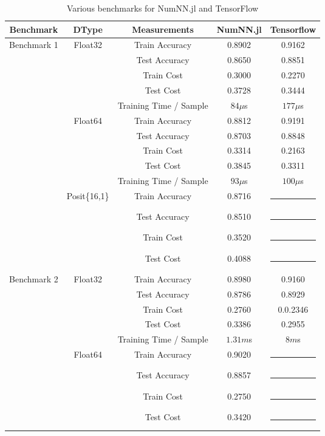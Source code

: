 \begin{table}[!ht]
	\centering
	\renewcommand{\arraystretch}{1.1}
	\caption{Various benchmarks for NumNN.jl and TensorFlow}\label{tab:bench}
	\begin{tabular}{|c | c | c || c | c |}
		\hline
		Benchmark & DType & Measurements & NumNN.jl & Tensorflow\\\hline\hline
		\multirow{14}{*}{Benchmark 1} & \multirow{5}{*}{Float32} & Train Accuracy & 0.8902 & 0.9162\\
		& & Test Accuracy & 0.8650 & 0.8851\\
		& & Train Cost & 0.3000 & 0.2270\\
		& & Test Cost & 0.3728 & 0.3444\\
		& & Training Time / Sample & $84\mu$s  & $177\mu$s\\\cline{2-5}
		& \multirow{5}{*}{Float64} & Train Accuracy & 0.8812 & 0.9191 \\
		& & Test Accuracy & 0.8703 & 0.8848 \\
		& & Train Cost & 0.3314 & 0.2163 \\
		& & Test Cost & 0.3845 & 0.3311 \\
		& & Training Time / Sample & $93\mu$s & $100\mu$s\\\cline{2-5}
		& \multirow{4}{*}{Posit\{16,1\}} & Train Accuracy & 0.8716 & \rule{5em}{1pt} \\
		& & Test Accuracy & 0.8510 & \rule{5em}{1pt} \\
		& & Train Cost & 0.3520 & \rule{5em}{1pt} \\
		& & Test Cost & 0.4088 & \rule{5em}{1pt} \\\hline
		\multirow{14}{*}{Benchmark 2\footref{batchnorm}} & \multirow{5}{*}{Float32} & Train Accuracy & 0.8980 & 0.9160\\
		& & Test Accuracy & 0.8786 & 0.8929\\
		& & Train Cost & 0.2760 & 0.0.2346\\
		& & Test Cost & 0.3386 & 0.2955\\
		& & Training Time / Sample & $1.31m$s & $8m$s \\\cline{2-5}
		& \multirow{5}{*}{Float64} & Train Accuracy & 0.9020 & \rule{5em}{1pt} \\
		& & Test Accuracy & 0.8857 & \rule{5em}{1pt} \\
		& & Train Cost & 0.2750 & \rule{5em}{1pt} \\
		& & Test Cost & 0.3420 & \rule{5em}{1pt} \\

\end{tabular}
\end{table}
